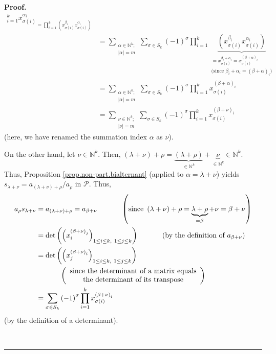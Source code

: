 \documentclass[numbers=enddot,12pt,final,onecolumn,notitlepage]{scrartcl}%
\theoremstyle{definition}
\newenvironment{proof}[1][Proof]{\noindent\textbf{#1.} }{\ \rule{0.5em}{0.5em}}
\let\sumnonlimits\sum
\let\prodnonlimits\prod
\renewcommand{\sum}{\sumnonlimits\limits}
\renewcommand{\prod}{\prodnonlimits\limits}
\begin{document}
\begin{proof}
\begin{align}
{_{i=1}^{k}x_{\sigma\left(  i\right)  }^{\alpha_{i}}}_{=\prod_{i=1}^{k}\left(
x_{\sigma\left(  i\right)  }^{\beta_{i}}x_{\sigma\left(  i\right)  }%
^{\alpha_{i}}\right)  }\nonumber\\
&  =\sum_{\substack{\alpha\in\mathbb{N}^{k};\\\left\vert \alpha\right\vert
=m}}\sum_{\sigma\in S_{k}}\left(  -1\right)  ^{\sigma}\prod_{i=1}%
^{k}\underbrace{\left(  x_{\sigma\left(  i\right)  }^{\beta_{i}}%
x_{\sigma\left(  i\right)  }^{\alpha_{i}}\right)  }_{\substack{=x_{\sigma
\left(  i\right)  }^{\beta_{i}+\alpha_{i}}=x_{\sigma\left(  i\right)
}^{\left(  \beta+\alpha\right)  _{i}}\\\text{(since }\beta_{i}+\alpha
_{i}=\left(  \beta+\alpha\right)  _{i}\text{)}}}\nonumber\\
&  =\sum_{\substack{\alpha\in\mathbb{N}^{k};\\\left\vert \alpha\right\vert
=m}}\sum_{\sigma\in S_{k}}\left(  -1\right)  ^{\sigma}\prod_{i=1}^{k}%
x_{\sigma\left(  i\right)  }^{\left(  \beta+\alpha\right)  _{i}}\nonumber\\
&  =\sum_{\substack{\nu\in\mathbb{N}^{k};\\\left\vert \nu\right\vert =m}%
}\sum_{\sigma\in S_{k}}\left(  -1\right)  ^{\sigma}\prod_{i=1}^{k}%
x_{\sigma\left(  i\right)  }^{\left(  \beta+\nu\right)  _{i}}
\label{pf.thm.non-part.pieri-h.3}%
\end{align}
(here, we have renamed the summation index $\alpha$ as $\nu$).

On the other hand, let $\nu\in\mathbb{N}^{k}$. Then, $\left(  \lambda
+\nu\right)  +\rho=\underbrace{\left(  \lambda+\rho\right)  }_{\in
\mathbb{N}^{k}}+\underbrace{\nu}_{\in\mathbb{N}^{k}}\in\mathbb{N}^{k}$. Thus,
Proposition \ref{prop.non-part.bialternant} (applied to $\alpha=\lambda+\nu$)
yields $s_{\lambda+\nu}=a_{\left(  \lambda+\nu\right)  +\rho}/a_{\rho}$ in
$\mathcal{P}$. Thus,
\begin{align}
a_{\rho}s_{\lambda+\nu}  &  =a_{\left(  \lambda+\nu\right)  +\rho}%
=a_{\beta+\nu}\ \ \ \ \ \ \ \ \ \ \left(  \text{since }\left(  \lambda
+\nu\right)  +\rho=\underbrace{\lambda+\rho}_{=\beta}+\nu=\beta+\nu\right)
\nonumber\\
&  =\det\left(  \left(  x_{i}^{\left(  \beta+\nu\right)  _{j}}\right)  _{1\leq
i\leq k,\ 1\leq j\leq k}\right)  \ \ \ \ \ \ \ \ \ \ \left(  \text{by the
definition of }a_{\beta+\nu}\right) \nonumber\\
&  =\det\left(  \left(  x_{j}^{\left(  \beta+\nu\right)  _{i}}\right)  _{1\leq
i\leq k,\ 1\leq j\leq k}\right) \nonumber\\
&  \ \ \ \ \ \ \ \ \ \ \left(
\begin{array}
[c]{c}%
\text{since the determinant of a matrix equals}\\
\text{the determinant of its transpose}%
\end{array}
\right) \nonumber\\
&  =\sum_{\sigma\in S_{k}}\left(  -1\right)  ^{\sigma}\prod_{i=1}^{k}%
x_{\sigma\left(  i\right)  }^{\left(  \beta+\nu\right)  _{i}}
\label{pf.thm.non-part.pieri-h.4}%
\end{align}
(by the definition of a determinant).


\end{proof}
\end{document}
